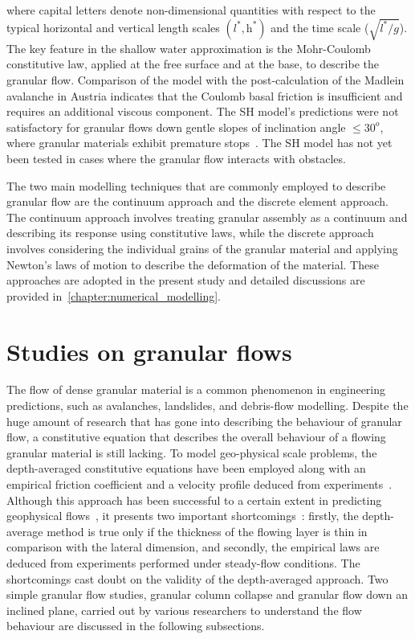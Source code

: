 %
where capital letters denote non-dimensional quantities with respect to the 
typical horizontal and vertical length scales $(\textit{l}^{*},\textit{h}^{*})$ 
and the time scale ($\sqrt{\textit{l}^{*}/\textit{g}}$). The key feature in the 
shallow water approximation is the Mohr-Coulomb constitutive law, 
applied at the free surface and at the base, to describe the granular flow. 
Comparison of the model with the post-calculation of the Madlein avalanche in 
Austria indicates that the Coulomb basal friction is insufficient and requires 
an additional viscous component. The SH model's predictions were not 
satisfactory for granular flows down gentle slopes of inclination angle $\le 
30^{o}$, where granular materials exhibit premature stops~\citep{Hutter2005}. 
The SH model has not yet been tested in cases where the granular flow interacts 
with obstacles.

The two main modelling techniques that are commonly employed to describe 
granular flow are the continuum approach and the discrete element approach. The 
continuum approach involves treating granular assembly as a continuum and 
describing its response using constitutive laws, while the discrete approach 
involves considering the individual grains of the granular material and 
applying Newton's laws of motion to describe the deformation of the material. 
These approaches are adopted in the present study and detailed 
discussions are provided in~\cref{chapter:numerical_modelling}. 

\section{Studies on granular flows}
The flow of dense granular material is a common phenomenon in engineering 
predictions, such as avalanches, landslides, and debris-flow modelling. Despite 
the huge amount of research that has gone into describing the behaviour of 
granular flow, a constitutive equation that describes the overall behaviour of 
a flowing granular material is still lacking. To model geo-physical scale 
problems, the depth-averaged constitutive equations have been employed along 
with an empirical friction coefficient and a velocity profile deduced from 
experiments~\citep{Midi2004,Iverson2003,Pouliquen1999}. Although this approach 
has been successful to a certain extent in predicting geophysical 
flows~\citep{Pouliquen2002a, Hutter1995}, it presents two important 
shortcomings~\citep{Lajeunesse2005}: firstly, the depth-average method is true 
only if the thickness of the flowing layer is thin in comparison with the 
lateral dimension, and secondly, the empirical laws are deduced from 
experiments performed under steady-flow conditions. The shortcomings cast doubt 
on the validity of the depth-averaged approach. Two simple granular flow 
studies, granular column collapse and granular flow down an inclined plane, 
carried out by various researchers to understand the flow behaviour are 
discussed in the following subsections.



